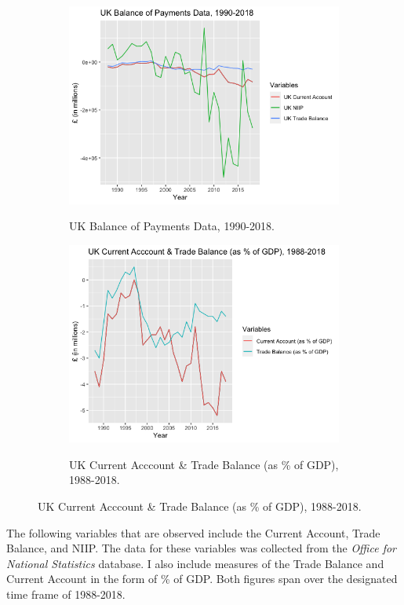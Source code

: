 \documentclass[12pt]{article}
\begin{document}
\begin{figure}[h!]
\centering
\begin{subfigure}{.5\textwidth}
  \centering
\includegraphics[scale=0.45]{2.png}
\label{}
\caption{UK Balance of Payments Data, 1990-2018.}
\end{subfigure}%
\begin{subfigure}{.5\textwidth}
  \centering
\includegraphics[scale=0.45]{3.png}
\label{}
\caption{UK Current Acccount \& Trade Balance (as \% of GDP), 1988-2018.}
\end{subfigure}
\end{figure}

The following variables that are observed include the Current Account, Trade Balance, and NIIP. The data for these variables was collected from the \textit{Office for National Statistics} database. I also include measures of the Trade Balance and Current Account in the form of \% of GDP. Both figures span over the designated time frame of 1988-2018.
\end{document}
